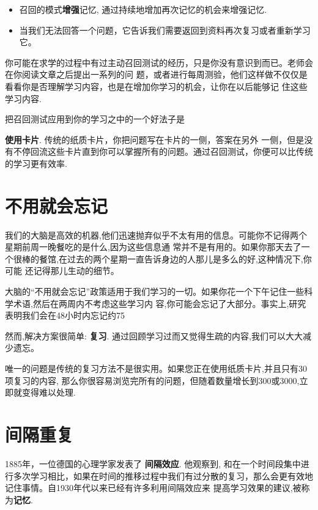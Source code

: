 \documentclass[a4paper]{book}
\begin{document}
	\begin{itemize}
		\itemsep1pt\parskip0pt
		\item 召回的模式\textbf{增强}记忆, 通过持续地增加再次记忆的机会来增强记忆.
		\item 当我们无法回答一个问题，它告诉我们需要返回到资料再次复习或者重新学习它。
	\end{itemize}
	
	你可能在求学的过程中有过主动召回测试的经历，只是你没有意识到而已。老师会在你阅读文章之后提出一系列的问 题，或者进行每周测验，他们这样做不仅仅是看看你是否理解学习内容，也是在增加你学习的机会，让你在以后能够记 住这些学习内容.
	
	把召回测试应用到你的学习之中的一个好法子是
	
	\textbf{使用卡片}. 传统的纸质卡片，你把问题写在卡片的一侧，答案在另外 一侧，但是没有不停回流这些卡片直到你可以掌握所有的问题。通过召回测试，你便可以比传统的学习更有效率.
	
	\section{不用就会忘记}
	
	我们的大脑是高效的机器,他们迅速抛弃似乎不太有用的信息。可能你不记得两个星期前周一晚餐吃的是什么,因为这些信息通 常并不是有用的。如果你那天去了一个很棒的餐馆,在过去的两个星期一直告诉身边的人那儿是多么的好,这种情况下,你可能 还记得那儿生动的细节。
	
	大脑的“不用就会忘记”政策适用于我们学习的一切。如果你花一个下午记住一些科学术语,然后在两周内不考虑这些学习内 容,你可能会忘记了大部分。事实上,研究表明我们会在48小时内忘记约75%
	
	然而,解决方案很简单: \textbf{复习}. 通过回顾学习过而又觉得生疏的内容,我们可以大大减少遗忘。
	
	唯一的问题是传统的复习方法不是很实用。如果您正在使用纸质卡片,并且只有30项复习的内容, 那么你很容易浏览完所有的问题，但随着数量增长到300或3000,立即就变得难以处理.
	
	\section{间隔重复}\label{whatalgorithm}
	
	1885年，一位德国的心理学家发表了 \textbf{间隔效应}. 他观察到, 和在一个时间段集中进行多次学习相比，如果在时间的推移过程中我们有过分散的复习，那么会更有效地记住事情。自1930年代以来已经有许多利用间隔效应来 提高学习效果的建议,被称为\textbf{记忆}.
	
\end{document}
